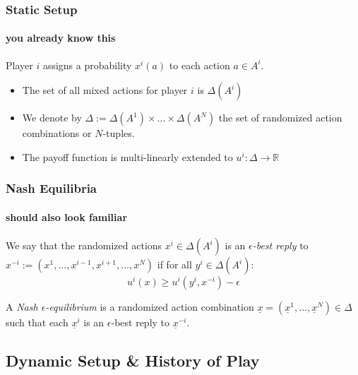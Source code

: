 \documentclass{beamer}
\newcommand{\eq}[1]{\underline{#1}}
\begin{document}
\begin{frame}
    \frametitle{Static Setup}
    \framesubtitle{you already know this}
	\begin{definition}
		Player $i$ assigns a
		probability $x^i(a)$ to each action $a \in A^i$.
		\begin{itemize}
			\item The set of all mixed actions for player $i$ is $\Delta(A^i)$
			\item We denote by $\Delta := \Delta(A^1) \times ... \times \Delta(A^N)$
				the set of randomized action combinations or $N$-tuples.
			\item The payoff function is multi-linearly extended to $u^i : \Delta \to \mathbb{R}$
		\end{itemize}
	\end{definition}
\end{frame}


\begin{frame}
    \frametitle{Nash Equilibria}
    \framesubtitle{should also look familiar}
	\begin{definition}
		We say that the randomized actions $x^i \in \Delta(A^i)$ is an \emph{$\epsilon$-best reply}
		to $x^{-i} := (x^1, ..., x^{i-1}, x^{i+1}, ..., x^N)$ if for all $y^i \in \Delta(A^i)$:
		\[
			u^i(x) \geq u^i(y^i, x^{-i}) - \epsilon
		\]
	\end{definition}
    \pause %
	\begin{definition}
		A \emph{Nash $\epsilon$-equilibrium} is a randomized action combination $\eq{x} =
		(\eq{x}^1, ..., \eq{x}^N) \in \Delta$ such that each $\eq{x}^i$ is an $\epsilon$-best reply
		to $\eq{x}^{-i}$.
	\end{definition}
\end{frame}

\subsection{Dynamic Setup \& History of Play}
\end{document}
